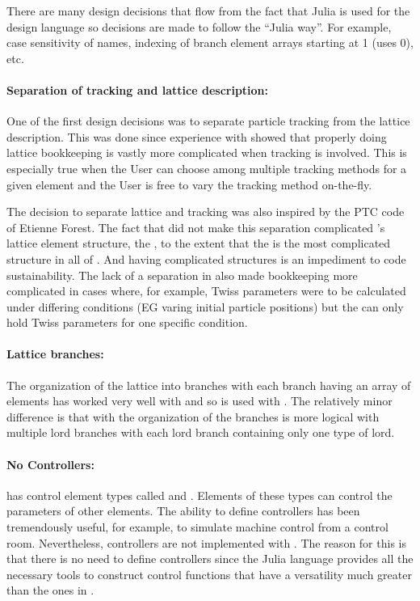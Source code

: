 There are many design decisions that flow from the fact that Julia is used for the design language
so decisions are made to follow the ``Julia way''.
For example, case sensitivity of names, indexing of branch element arrays starting at 1 (\bmad uses 0),
etc.

\paragraph{Separation of tracking and lattice description:} 
One of the first \accellat design decisions was to separate particle tracking from the lattice description. 
This was done since experience with \bmad showed that properly doing lattice bookkeeping is vastly
more complicated when tracking is involved. This is especially true when the User can choose
among multiple tracking methods for a given element and the User is free to vary the tracking method
on-the-fly.

The decision to separate lattice and tracking was also inspired by the PTC code of Etienne Forest.
The fact that \bmad did not make this separation complicated \bmad's lattice element structure,
the , 
to the extent that the  is the most complicated structure in all of \bmad. And
having complicated structures is an impediment to code sustainability.
The lack of a separation in \bmad also made bookkeeping more complicated in cases where, for example, 
Twiss parameters were to be calculated under differing conditions (EG varing initial 
particle positions) but the  can only hold Twiss parameters for one specific
condition.

\paragraph{Lattice branches:}
The organization of the lattice into branches with each branch having an array of elements has
worked very well with \bmad and so is used with \accellat. The relatively minor difference is
that with \accellat the organization of the branches is more logical with multiple lord branches
with each lord branch containing only one type of lord.

\paragraph{No Controllers:}
\bmad has control element types called  and . Elements of these types
can control the parameters of other elements. 
The ability to define controllers has been tremendously useful, for example,
to simulate machine control from a control room. Nevertheless, controllers are not implemented
with \accellat. The reason for this is that there is no need to define controllers since the Julia
language provides all the necessary tools to construct control functions that have a versatility
much greater than the ones in \bmad.

